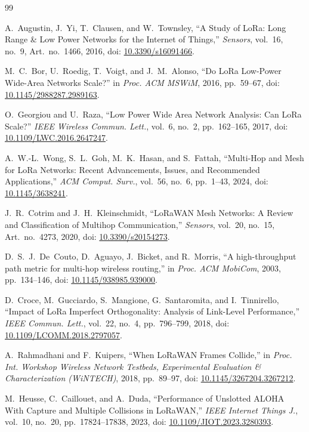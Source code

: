 \documentclass[conference,letterpaper,10pt]{IEEEtran}
\begin{document}
\begin{thebibliography}{99}

A.~Augustin, J.~Yi, T.~Clausen, and W.~Townsley,
``A Study of LoRa: Long Range \& Low Power Networks for the Internet of Things,''
\emph{Sensors}, vol.~16, no.~9, Art.~no.~1466, 2016,
doi: \url{10.3390/s16091466}.

M.~C.~Bor, U.~Roedig, T.~Voigt, and J.~M.~Alonso,
``Do LoRa Low-Power Wide-Area Networks Scale?''
in \emph{Proc. ACM MSWiM}, 2016, pp.~59--67,
doi: \url{10.1145/2988287.2989163}.

O.~Georgiou and U.~Raza,
``Low Power Wide Area Network Analysis: Can LoRa Scale?''
\emph{IEEE Wireless Commun. Lett.}, vol.~6, no.~2, pp.~162--165, 2017,
doi: \url{10.1109/LWC.2016.2647247}.

A.~W.-L.~Wong, S.~L.~Goh, M.~K.~Hasan, and S.~Fattah,
``Multi-Hop and Mesh for LoRa Networks: Recent Advancements, Issues, and Recommended Applications,''
\emph{ACM Comput. Surv.}, vol.~56, no.~6, pp.~1--43, 2024,
doi: \url{10.1145/3638241}.

J.~R.~Cotrim and J.~H.~Kleinschmidt,
``LoRaWAN Mesh Networks: A Review and Classification of Multihop Communication,''
\emph{Sensors}, vol.~20, no.~15, Art.~no.~4273, 2020,
doi: \url{10.3390/s20154273}.

D.~S.~J.~De~Couto, D.~Aguayo, J.~Bicket, and R.~Morris,
``A high-throughput path metric for multi-hop wireless routing,''
in \emph{Proc. ACM MobiCom}, 2003, pp.~134--146,
doi: \url{10.1145/938985.939000}.

D.~Croce, M.~Gucciardo, S.~Mangione, G.~Santaromita, and I.~Tinnirello,
``Impact of LoRa Imperfect Orthogonality: Analysis of Link-Level Performance,''
\emph{IEEE Commun. Lett.}, vol.~22, no.~4, pp.~796--799, 2018,
doi: \url{10.1109/LCOMM.2018.2797057}.

A.~Rahmadhani and F.~Kuipers,
``When LoRaWAN Frames Collide,''
in \emph{Proc. Int. Workshop Wireless Network Testbeds, Experimental Evaluation \& Characterization (WiNTECH)}, 2018, pp.~89--97,
doi: \url{10.1145/3267204.3267212}.

M.~Heusse, C.~Caillouet, and A.~Duda,
``Performance of Unslotted ALOHA With Capture and Multiple Collisions in LoRaWAN,''
\emph{IEEE Internet Things J.}, vol.~10, no.~20, pp.~17824--17838, 2023,
doi: \url{10.1109/JIOT.2023.3280393}.


\end{thebibliography}
\end{document}
